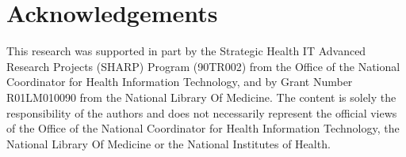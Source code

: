 \documentclass[10pt, a4paper]{article}
\begin{document}
\section*{Acknowledgements}
This research was supported in part by the Strategic Health IT Advanced Research Projects (SHARP) Program (90TR002) from the Office of the National Coordinator for Health Information Technology, and by Grant Number R01LM010090 from the National Library Of Medicine. The content is solely the responsibility of the authors and does not necessarily represent the official views of the Office of the National Coordinator for Health Information Technology, the National Library Of Medicine or the National Institutes of Health.



\end{document}
